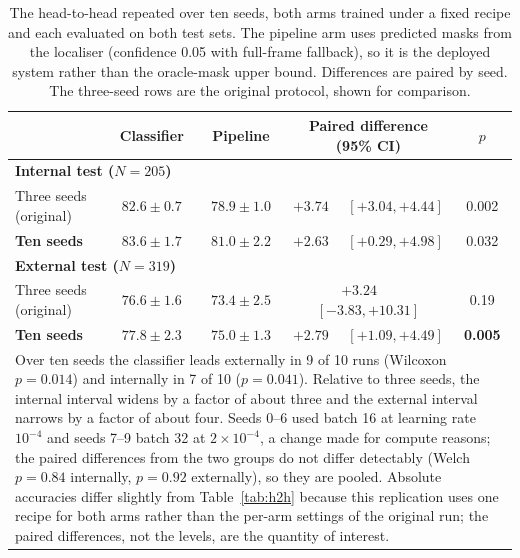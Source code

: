 \documentclass{elektr}
\newcommand{\vs}{\vspace}
\begin{document}

\begin{table}[!ht]
\caption{The head-to-head repeated over ten seeds, both arms trained under a fixed recipe and each evaluated on both test sets. The pipeline arm uses predicted masks from the localiser (confidence 0.05 with full-frame fallback), so it is the deployed system rather than the oracle-mask upper bound. Differences are paired by seed. The three-seed rows are the original protocol, shown for comparison.}
\begin{center}
\small
\begin{tabular}{|l|c|c|c|c|}
\hline
 & Classifier & Pipeline & Paired difference (95\% CI) & $p$ \\
\hline
\multicolumn{5}{|l|}{\textbf{Internal test ($N=205$)}} \\
\hline
Three seeds (original) & $82.6 \pm 0.7$ & $78.9 \pm 1.0$ & $+3.74$ \ \ $[+3.04, +4.44]$ & 0.002 \\
\textbf{Ten seeds} & $83.6 \pm 1.7$ & $81.0 \pm 2.2$ & $\mathbf{+2.63}$ \ \ $\mathbf{[+0.29, +4.98]}$ & 0.032 \\
\hline
\multicolumn{5}{|l|}{\textbf{External test ($N=319$)}} \\
\hline
Three seeds (original) & $76.6 \pm 1.6$ & $73.4 \pm 2.5$ & $+3.24$ \ \ $[-3.83, +10.31]$ & 0.19 \\
\textbf{Ten seeds} & $77.8 \pm 2.3$ & $75.0 \pm 1.3$ & $\mathbf{+2.79}$ \ \ $\mathbf{[+1.09, +4.49]}$ & \textbf{0.005} \\
\hline
\multicolumn{5}{|p{0.92\textwidth}|}{Over ten seeds the classifier leads externally in 9 of 10 runs (Wilcoxon $p=0.014$) and internally in 7 of 10 ($p=0.041$). Relative to three seeds, the internal interval widens by a factor of about three and the external interval narrows by a factor of about four. Seeds 0--6 used batch 16 at learning rate $10^{-4}$ and seeds 7--9 batch 32 at $2\times10^{-4}$, a change made for compute reasons; the paired differences from the two groups do not differ detectably (Welch $p=0.84$ internally, $p=0.92$ externally), so they are pooled. Absolute accuracies differ slightly from Table~\ref{tab:h2h} because this replication uses one recipe for both arms rather than the per-arm settings of the original run; the paired differences, not the levels, are the quantity of interest.} \\
\hline
\end{tabular}
\label{tab:paired}
\end{center}\vs{-4mm}
\end{table}
\end{document}

